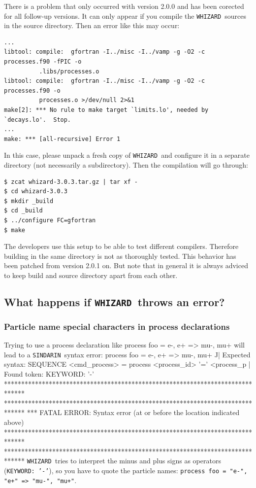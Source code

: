 \documentclass[12pt]{book}
\newenvironment{code}%
  {\begingroup\footnotesize
   \quote
   \Verbatim}%
  {\endVerbatim
   \endquote
   \endgroup\noindent}
\newenvironment{Code}%
  {\begingroup\footnotesize
   \quote
   \Verbatim[frame=single]}%
  {\endVerbatim
   \endquote
   \endgroup\noindent}
\newcommand{\ttt}[1]{\texttt{#1}}
\newcommand{\whizard}{\ttt{WHIZARD}}
\newcommand{\sindarin}{\ttt{SINDARIN}}
\begin{document}
There is a problem that only occurred with version 2.0.0 and has been
corected for all follow-up versions. It can only appear if you
compile the \whizard\ sources in the source directory. Then an error
like this may occur:
\begin{footnotesize}
\begin{Verbatim}[frame=single]
...
libtool: compile:  gfortran -I../misc -I../vamp -g -O2 -c processes.f90 -fPIC -o
          .libs/processes.o
libtool: compile:  gfortran -I../misc -I../vamp -g -O2 -c processes.f90 -o
          processes.o >/dev/null 2>&1
make[2]: *** No rule to make target `limits.lo', needed by `decays.lo'.  Stop.
...
make: *** [all-recursive] Error 1
\end{Verbatim}
\end{footnotesize}
In this case, please unpack a fresh copy of \whizard\ and configure it
in a separate directory (not necessarily a subdirectory). Then the
compilation will go through:
\begin{footnotesize}
\begin{Verbatim}[frame=single]
$ zcat whizard-3.0.3.tar.gz | tar xf -
$ cd whizard-3.0.3
$ mkdir _build
$ cd _build
$ ../configure FC=gfortran
$ make
\end{Verbatim}
\end{footnotesize}
The developers use this setup to be able to test different
compilers. Therefore building in the same directory is not as
thoroughly tested. This behavior has been patched from version 2.0.1
on. But note that in general it is always adviced to keep
build and source directory apart from each other.


\subsection{What happens if \whizard\ throws an error?}
\label{ref:errors}

\subsubsection{Particle name special characters in process
  declarations}

Trying to use a process declaration like
\begin{code}
process foo = e-, e+ => mu-, mu+
\end{code}
will lead to a \sindarin\ syntax error:
\begin{Code}
process foo = e-, e+ => mu-, mu+
               ^^
| Expected syntax: SEQUENCE    <cmd_process> = process <process_id> '=' <process_p
| Found token: KEYWORD:    '-'
******************************************************************************
******************************************************************************
*** FATAL ERROR:  Syntax error (at or before the location indicated above)
******************************************************************************
******************************************************************************
\end{Code}
\whizard\ tries to interpret the minus and plus signs as operators
(\ttt{KEYWORD: '-'}), so you have to quote the particle names:
\ttt{process foo = "e-", "e+" => "mu-", "mu+"}.
\end{document}
